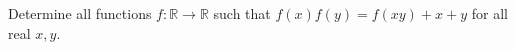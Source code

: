 Determine all functions $f:\mathbb R\to\mathbb R$ such that $f(x)f(y)=f(xy)+x+y$ for all real $x,y$.
